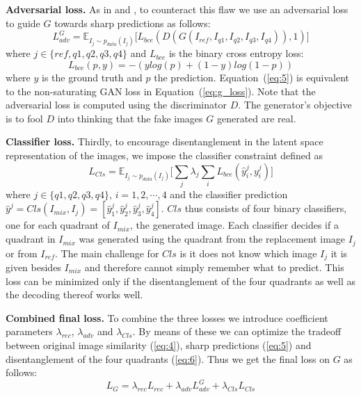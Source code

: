 \documentclass[12pt,a4paper]{article}
\begin{document}
\textbf{Adversarial loss.} As in \cite{DisentFacOfVarByMixTh} and \cite{1511.05440}, to counteract this flaw we use an adversarial loss to guide $G$ towards sharp predictions as follows:
\begin{equation} \label{eq:5}
    L^G_{adv} = \mathbb{E}_{I_{j}\sim p_{data} (I_{j})}\big[ L_{bce}(D(G(I_{ref},I_{q1},I_{q2},I_{q3},I_{q4})), 1)\big]
\end{equation}
where $j \in \{ref,q1,q2,q3,q4\}$ and $L_{bce}$ is the binary cross entropy loss:
\begin{equation} \label{eq:6}
    L_{bce}(p, y) = -(ylog(p) + (1 - y)log(1-p))
\end{equation}
where $y$ is the ground truth and $p$ the prediction. Equation~(\ref{eq:5}) is equivalent to the non-saturating GAN loss in Equation~(\ref{eq:g_loss}). Note that the adversarial loss is computed using the discriminator $D$. The generator's objective is to fool $D$ into thinking that the fake images $G$ generated are real.

\textbf{Classifier loss.} Thirdly, to encourage disentanglement in the latent space representation of the images, we impose the classifier constraint defined as
\begin{equation} \label{eq:cls}
    L_{Cls} = \mathbb{E}_{I_{j}\sim p_{data} (I_{j})}\big[\sum_{j} \lambda_j \sum_{i} L_{bce}(\hat{y}^j_i, y^j_i)\big]
\end{equation}
where $j \in \{q1,q2,q3,q4\}$, $i=1,2,\cdots,4$ and the classifier prediction $\hat{y}^j = Cls(I_{mix}, I_j) = [\hat{y}^j_1, \hat{y}^j_2, \hat{y}^j_3, \hat{y}^j_4]$. $Cls$ thus consists of four binary classifiers, one for each quadrant of $I_{mix}$, the generated image. Each classifier decides if a quadrant in $I_{mix}$ was generated using the quadrant from the replacement image $I_j$ or from $I_{ref}$. The main challenge for $Cls$ is it does not know which image $I_j$ it is given besides $I_{mix}$ and therefore cannot simply remember what to predict. This loss can be minimized only if the disentanglement of the four quadrants as well as the decoding thereof works well.

\textbf{Combined final loss.} To combine the three losses we introduce coefficient parameters $\lambda_{rec}$, $\lambda_{adv}$ and $\lambda_{Cls}$. By means of these we can optimize the tradeoff between original image similarity (\ref{eq:4}), sharp predictions (\ref{eq:5}) and disentanglement of the four quadrants (\ref{eq:6}). Thus we get the final loss on $G$ as follows:
\begin{equation} \label{eq:g_loss_comp}
    L_{G} = \lambda_{rec} L_{rec} + \lambda_{adv} L^G_{adv} + \lambda_{Cls} L_{Cls}
\end{equation}
\end{document}
